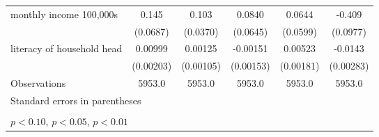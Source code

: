 \begin{table}[htbp]
\begin{tabular*}{1.0\hsize}{@{\hskip\tabcolsep\extracolsep\fill}l*{5}{c}}
\addlinespace
monthly income 100,000s         &       0.145\sym{**} &       0.103\sym{***}&      0.0840         &      0.0644         &      -0.409\sym{***}\\
                                &    (0.0687)         &    (0.0370)         &    (0.0645)         &    (0.0599)         &    (0.0977)         \\
\addlinespace
literacy of household head      &     0.00999\sym{***}&     0.00125         &    -0.00151         &     0.00523\sym{***}&     -0.0143\sym{***}\\
                                &   (0.00203)         &   (0.00105)         &   (0.00153)         &   (0.00181)         &   (0.00283)         \\
\midrule
Observations                    &      5953.0         &      5953.0         &      5953.0         &      5953.0         &      5953.0         \\
\bottomrule
\multicolumn{6}{l}{\footnotesize Standard errors in parentheses}\\
\multicolumn{6}{l}{\footnotesize }\\
\multicolumn{6}{l}{\footnotesize \sym{*} \(p<0.10\), \sym{**} \(p<0.05\), \sym{***} \(p<0.01\)}\\
\end{tabular*}
\end{table}
